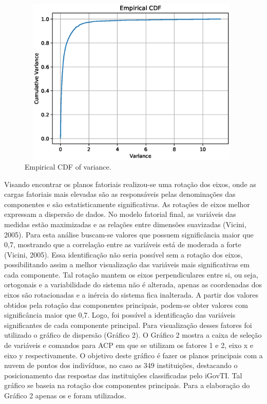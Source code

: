 \begin{figure}[h!]
     \centering 
     \includegraphics[height=8cm, width=11cm]{figures/ch2/raw_variance_ecdf.eps}
     \caption{Empirical CDF of variance.}
     \label{fig:ch2_fig2}
\end{figure}
 
Visando encontrar os planos fatoriais realizou-se uma rotação dos eixos, onde as cargas fatoriais mais elevadas são as responsáveis pelas denominações das componentes e são estatisticamente significativas. As rotações de eixos melhor expressam a dispersão de dados. No modelo fatorial final, as variáveis das medidas estão maximizadas e as relações entre dimensões suavizadas (Vicini, 2005).
Para esta análise buscam-se valores que possuem significância maior que 0,7, mostrando que a correlação entre as variáveis está de moderada a forte (Vicini, 2005). Essa identificação não seria possível sem a rotação dos eixos, possibilitando assim a melhor visualização das variáveis mais significativas em cada componente. Tal rotação mantem os eixos perpendiculares entre si, ou seja, ortogonais e a variabilidade do sistema não é alterada, apenas as coordenadas dos eixos são rotacionadas e a inércia do sistema fica inalterada. 
A partir dos valores obtidos pela rotação das componentes principais, podem-se obter valores com significância maior que 0,7. Logo, foi possível a identificação das variáveis significantes de cada componente principal.
Para visualização desses fatores foi utilizado o gráfico de dispersão (Gráfico 2). O Gráfico 2 mostra a caixa de seleção de variáveis e comandos para ACP em que se utilizam os fatores 1 e 2, eixo x e eixo y respectivamente. O objetivo deste gráfico é fazer os planos principais com a nuvem de pontos dos indivíduos, no caso as 349 instituições, destacando o posicionamento das respostas das instituições classificadas pelo iGovTI. Tal gráfico se baseia na rotação dos componentes principais. Para a elaboração do Gráfico 2 apenas os  e  foram utilizados.
 

